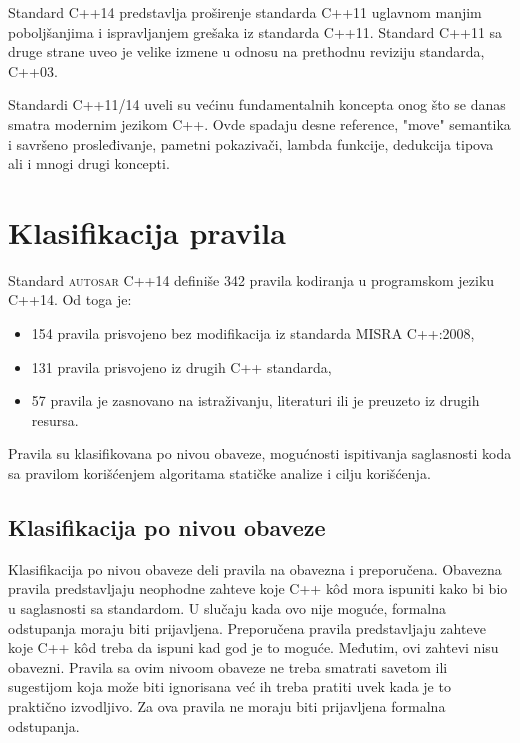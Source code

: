\documentclass[12pt,oneside]{memoir}
\begin{document}
Standard C++14 predstavlja pro\v{s}irenje standarda C++11 uglavnom manjim pobolj\v{s}anjima i ispravljanjem gre\v{s}aka iz standarda C++11. Standard C++11 sa druge strane uveo je velike izmene u odnosu na prethodnu reviziju standarda, C++03. \par
Standardi C++11/14 uveli su ve\'{c}inu fundamentalnih koncepta onog \v{s}to se danas smatra modernim jezikom C++. Ovde spadaju desne reference, "move" semantika i savr\v{s}eno prosleđivanje, pametni pokaziva\v{c}i, lambda funkcije, dedukcija tipova ali i mnogi drugi koncepti.

\section{Klasifikacija pravila}
Standard \textsc{autosar} C++14 definiše 342 pravila kodiranja u programskom jeziku C++14. Od toga je:
\begin{itemize}
  \item {154 pravila prisvojeno bez modifikacija iz standarda MISRA C++:2008,}
  \item {131 pravila prisvojeno iz drugih C++ standarda,}
  \item {57 pravila je zasnovano na istraživanju, literaturi ili je preuzeto iz drugih resursa.}
\end{itemize}
Pravila su klasifikovana po nivou obaveze, mogućnosti ispitivanja saglasnosti koda sa pravilom korišćenjem algoritama
statičke analize i cilju korišćenja.

\subsection{Klasifikacija po nivou obaveze}
Klasifikacija po nivou obaveze deli pravila na obavezna i preporučena.
Obavezna pravila predstavljaju neophodne zahteve koje C++ k\^{o}d mora ispuniti kako bi bio u saglasnosti sa standardom. U slučaju kada ovo nije moguće,
formalna odstupanja moraju biti prijavljena.
Preporučena pravila predstavljaju zahteve koje C++ k\^{o}d treba da ispuni kad god je to mogu\'{c}e. Međutim, ovi zahtevi nisu obavezni. Pravila
sa ovim nivoom obaveze ne treba smatrati savetom ili sugestijom koja može biti ignorisana ve\'{c} ih treba pratiti uvek kada je to prakti\v{c}no izvodljivo. Za ova pravila ne moraju biti prijavljena formalna odstupanja.
\end{document}
